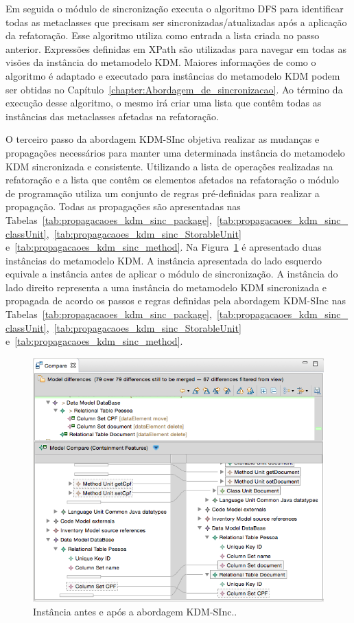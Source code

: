 Em seguida o módulo de sincronização executa o algoritmo DFS para identificar todas as metaclasses que precisam ser sincronizadas/atualizadas após a aplicação da refatoração. Esse algoritmo utiliza como entrada a lista criada no passo anterior. Expressões definidas em XPath são utilizadas para navegar em todas as visões da instância do metamodelo KDM. Maiores informações de como o algoritmo é adaptado e executado para instâncias do metamodelo KDM podem ser obtidas no Capítulo~\ref{chapter:Abordagem_de_sincronizacao}. Ao término da execução desse algoritmo, o mesmo irá criar uma lista que contêm todas as instâncias das metaclasses afetadas na refatoração. 
   

O terceiro passo da abordagem KDM-SInc objetiva realizar as mudanças e propagações necessários para manter uma determinada instância do metamodelo KDM sincronizada e consistente. Utilizando a lista de operações realizadas na refatoração e a lista que contêm os elementos afetados na refatoração o módulo de programação utiliza um conjunto de regras pré-definidas para realizar a propagação. Todas as propagações são apresentadas nas Tabelas~\ref{tab:propagacaoes_kdm_sinc_package},~\ref{tab:propagacaoes_kdm_sinc_classUnit},~\ref{tab:propagacaoes_kdm_sinc_StorableUnit} e~\ref{tab:propagacaoes_kdm_sinc_method}. Na Figura~\ref{fig:efeitoPropagacaoKDMSINC} é apresentado duas instâncias do metamodelo KDM. A instância apresentada do lado esquerdo equivale a instância antes de aplicar o módulo de sincronização. A instância do lado direito representa a uma instância do metamodelo KDM sincronizada e propagada de acordo os passos e regras definidas pela abordagem KDM-SInc nas Tabelas~\ref{tab:propagacaoes_kdm_sinc_package},~\ref{tab:propagacaoes_kdm_sinc_classUnit},~\ref{tab:propagacaoes_kdm_sinc_StorableUnit} e~\ref{tab:propagacaoes_kdm_sinc_method}.


\begin{figure}[!h]
	\centering
	\caption{Instância antes e após a abordagem KDM-SInc..}
	\label{fig:efeitoPropagacaoKDMSINC}
	\includegraphics[scale=0.7]{images/propagacaoKDMEfeito}
	\fautor
\end{figure}


